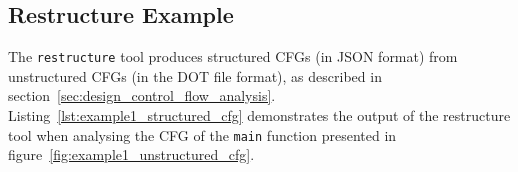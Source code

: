 
\subsection{Restructure Example}
\label{app:restructure_example}

The \texttt{restructure} tool produces structured CFGs (in JSON format) from unstructured CFGs (in the DOT file format), as described in section~\ref{sec:design_control_flow_analysis}. Listing~\ref{lst:example1_structured_cfg} demonstrates the output of the restructure tool when analysing the CFG of the \texttt{main} function presented in figure~\ref{fig:example1_unstructured_cfg}.


